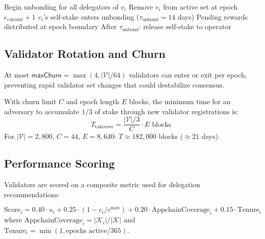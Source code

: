 \begin{algorithm}[H]
\caption{Voluntary Validator Exit}
\label{alg:exit}
\begin{algorithmic}[1]
    \State Begin unbonding for all delegators of $v_i$
    \State Remove $v_i$ from active set at epoch $e_{\text{current}} + 1$
    \State $v_i$'s self-stake enters unbonding ($\tau_{\text{unbond}} = 14$ days)
    \State Pending rewards distributed at epoch boundary
    \State After $\tau_{\text{unbond}}$: release self-stake to operator
\EndProcedure
\end{algorithmic}
\end{algorithm}

\subsection{Validator Rotation and Churn}

\begin{definition}
At most $\mathsf{maxChurn} = \max(4, |\mathcal{V}| / 64)$ validators can enter or exit per epoch, preventing rapid validator set changes that could destabilize consensus.
\end{definition}

\begin{proposition}
With churn limit $C$ and epoch length $E$ blocks, the minimum time for an adversary to accumulate $1/3$ of stake through new validator registrations is:
\begin{equation}
    T_{\text{takeover}} = \frac{|\mathcal{V}| / 3}{C} \cdot E \text{ blocks}
\end{equation}
For $|\mathcal{V}| = 2{,}800$, $C = 44$, $E = 8{,}640$: $T \approx 182{,}000$ blocks ($\approx 21$ days).
\end{proposition}

\subsection{Performance Scoring}

Validators are scored on a composite metric used for delegation recommendations:

\begin{definition}
\begin{equation}
    \text{Score}_i = 0.40 \cdot u_i + 0.25 \cdot (1 - c_i / c^{\max}) + 0.20 \cdot \text{AppchainCoverage}_i + 0.15 \cdot \text{Tenure}_i
\end{equation}
where $\text{AppchainCoverage}_i = |\mathcal{K}_i| / |\mathcal{K}|$ and $\text{Tenure}_i = \min(1, \text{epochs active} / 365)$.
\end{definition}

